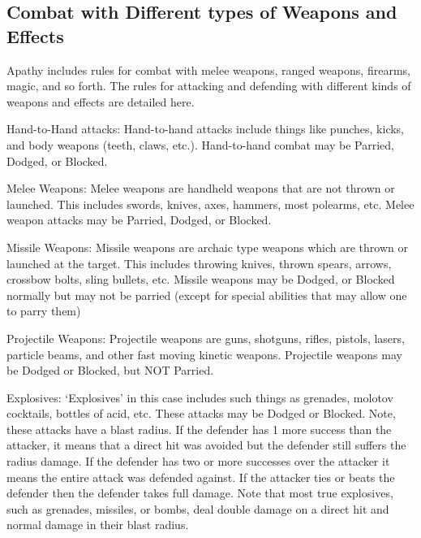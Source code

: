\documentclass[twoside]{book}
\begin{document}
\subsection{Combat with Different types of Weapons and Effects}
     Apathy includes rules for combat with melee weapons,
               ranged weapons, firearms, magic, and so forth. The rules
               for attacking and defending with different kinds of
               weapons and effects are detailed here.   
              
                 Hand-to-Hand attacks:   
                  Hand-to-hand attacks include things like punches,
                 kicks, and body weapons (teeth, claws, etc.).
                 Hand-to-hand combat may be Parried, Dodged, or Blocked.
                 
                
              
                 Melee Weapons:   
                  Melee weapons are handheld weapons that are not
                 thrown or launched. This includes swords, knives, axes,
                 hammers, most polearms, etc. Melee weapon attacks may be
                 Parried, Dodged, or Blocked. 
                
              
                 Missile Weapons:   
                  Missile weapons are archaic type weapons which
                 are thrown or launched at the target. This includes
                 throwing knives, thrown spears, arrows, crossbow bolts,
                 sling bullets, etc. Missile weapons may be Dodged, or
                 Blocked normally but may not be parried (except for
                 special abilities that may allow one to parry them)
                 
                
              
                 Projectile Weapons:   
                  Projectile weapons are guns, shotguns, rifles,
                 pistols, lasers, particle beams, and other fast moving
                 kinetic weapons. Projectile weapons may be Dodged or
                 Blocked, but NOT Parried. 
                
              
                 Explosives:   
                  `Explosives' in this case includes
                 such things as grenades, molotov cocktails, bottles of
                 acid, etc. These attacks may be Dodged or Blocked. Note,
                 these attacks have a blast radius. If the defender has 1
                 more success than the attacker, it means that a direct
                 hit was avoided but the defender still suffers the
                 radius damage. If the defender has two or more successes
                 over the attacker it means the entire attack was
                 defended against. If the attacker ties or beats the
                 defender then the defender takes full damage. Note that
                 most true explosives, such as grenades, missiles, or
                 bombs, deal double damage on a direct hit and normal
                 damage in their blast radius. 
                
\end{document}

